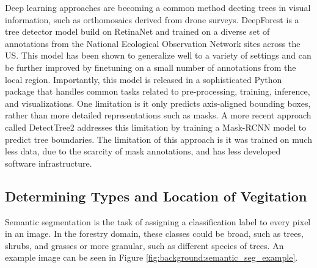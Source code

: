 Deep learning approaches are becoming a common method decting trees in visual information, such as orthomosaics derived from drone surveys. DeepForest \cite{Weinstein2020DeepForest:Delineation} is a tree detector model build on RetinaNet \cite{Lin2020FocalDetection} and trained on
a diverse set of annotations from the National Ecological Observation Network sites
\cite{Keller2008ANetwork} across the US. This model has been shown to generalize well to a variety of settings and can be further improved by finetuning on a small number of annotations from the local region. Importantly, this model is released in a sophisticated Python package that handles common tasks related to pre-processing, training, inference, and visualizations. One limitation is it only predicts axis-aligned bounding boxes, rather than more detailed representations such as masks. A more recent approach called DetectTree2 \cite{DetectTree2} addresses this limitation by training a Mask-RCNN \cite{He2017MaskR-CNN} model to predict tree boundaries. The limitation of this approach is it was trained on much less data, due to the scarcity of mask annotations, and has less developed software infrastructure.


\subsection{Determining Types and Location of Vegitation}

Semantic segmentation is the task of assigning a classification label to every pixel in an image. In the forestry domain, these classes could be broad, such as trees, shrubs, and grasses or more granular, such as different species of trees. An example image can be seen in Figure \ref{fig:background:semantic_seg_example}.

